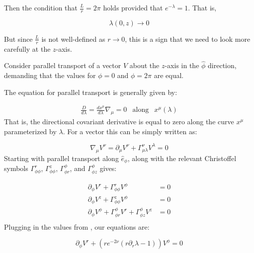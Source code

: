 \documentclass{article}
\begin{document}
Then the condition that $\frac{L}{r}=2\pi$ holds provided that
$e^{-\lambda}=1$. That is,

\begin{equation}
	\label{eq:lambda-elem-flat}
	\lambda(0,z)\rightarrow 0
\end{equation} 

But since $\frac{L}{r}$ is not well-defined as $r\rightarrow 0$, this is a sign
that we need to look more carefully at the $z$-axis.

Consider parallel transport of a vector $V$ about the $z$-axis in
the $\hat{\phi}$ direction, demanding that the values
for $\phi=0$ and $\phi=2\pi$ are equal. 

The equation for parallel transport is generally given by:
  	
\begin{equation}
\begin{array}{rcl} \frac{D}{d\lambda}=\frac{dx^{\mu}}{d\lambda}\nabla_{\mu}=0 & \mbox{along} & x^{\mu}\left(\lambda\right)	  	
\end{array}
\end{equation}	  	
That is, the directional covariant derivative is equal to zero along
the curve $x^{\mu}$ parameterized by $\lambda$. For a vector this can
be simply written as:

\begin{equation}
\label{eq:x-par-xport}
\nabla_\mu V^{\nu}=\partial_\mu V^\nu+\Gamma^\nu_{\mu\lambda} V^\lambda=0
\end{equation}	  	
Starting with parallel transport along $\hat{e}_{\phi}$,  along with the relevant Christoffel symbols $\Gamma^{r}_{\phi\phi}$, $\Gamma^{z}_{\phi\phi}$, $\Gamma^{\phi}_{\phi r}$, and $\Gamma^{\phi}_{\phi z}$ gives:
	  	
\begin{equation}
\begin{aligned}
\partial_{\phi}V^{r}+\Gamma^{r}_{\phi\phi}V^{\phi}&=0\\
\partial_{\phi}V^{z}+\Gamma^{z}_{\phi\phi}V^{\phi}&=0\\
\partial_{\phi}V^{\phi}+\Gamma^{\phi}_{\phi r}V^{r}+\Gamma^{\phi}_{\phi z}V^{z}&=0\\
\end{aligned}
\end{equation}
Plugging in the values from , our equations are: 

\begin{equation}
\partial_{\phi}V^{r}+\left(re^{-2\nu}\left(r\partial_{r}\lambda-1\right)\right)V^{\phi}=0\label{eq:V-r-phi}
\end{equation}
\end{document}
